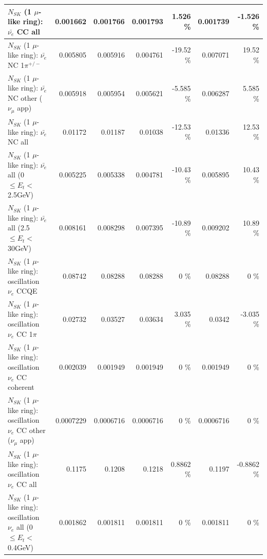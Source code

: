 \begin{table}
\begin{tabular}{| l | r | r | r  r | r  r |}
                            $N_{SK}$ (1 $\mu$-like ring): $\bar{\nu_{e}}$ CC all &        0.001662 &        0.001766 &        0.001793 &    1.526 \%  &        0.001739 &   -1.526 \%  \\ 
\hline
                     $N_{SK}$ (1 $\mu$-like ring): $\bar{\nu_e}$ NC 1$\pi^{+/-}$ &        0.005805 &        0.005916 &        0.004761 &   -19.52 \%  &        0.007071 &    19.52 \%  \\ 
            $N_{SK}$ (1 $\mu$-like ring): $\bar{\nu_e}$ NC other ($\nu_\mu$ app) &        0.005918 &        0.005954 &        0.005621 &   -5.585 \%  &        0.006287 &    5.585 \%  \\ 
                            $N_{SK}$ (1 $\mu$-like ring): $\bar{\nu_{e}}$ NC all &         0.01172 &         0.01187 &         0.01038 &   -12.53 \%  &         0.01336 &    12.53 \%  \\ 
\hline
     $N_{SK}$ (1 $\mu$-like ring): $\bar{\nu_{e}}$ all (0 $\leq E_{t} <$ 2.5GeV) &        0.005225 &        0.005338 &        0.004781 &   -10.43 \%  &        0.005895 &    10.43 \%  \\ 
    $N_{SK}$ (1 $\mu$-like ring): $\bar{\nu_{e}}$ all (2.5 $\leq E_{t} <$ 30GeV) &        0.008161 &        0.008298 &        0.007395 &   -10.89 \%  &        0.009202 &    10.89 \%  \\ 
\hline
\hline
\hline
                          $N_{SK}$ (1 $\mu$-like ring): oscillation $\nu_e$ CCQE &         0.08742 &         0.08288 &         0.08288 &        0 \%  &         0.08288 &        0 \%  \\ 
                     $N_{SK}$ (1 $\mu$-like ring): oscillation $\nu_e$ CC 1$\pi$ &         0.02732 &         0.03527 &         0.03634 &    3.035 \%  &          0.0342 &   -3.035 \%  \\ 
                   $N_{SK}$ (1 $\mu$-like ring): oscillation $\nu_e$ CC coherent &        0.002039 &        0.001949 &        0.001949 &        0 \%  &        0.001949 &        0 \%  \\ 
      $N_{SK}$ (1 $\mu$-like ring): oscillation $\nu_e$ CC other ($\nu_\mu$ app) &       0.0007229 &       0.0006716 &       0.0006716 &        0 \%  &       0.0006716 &        0 \%  \\ 
                       $N_{SK}$ (1 $\mu$-like ring): oscillation $\nu_e$  CC all &          0.1175 &          0.1208 &          0.1218 &   0.8862 \%  &          0.1197 &  -0.8862 \%  \\ 
\hline
$N_{SK}$ (1 $\mu$-like ring): oscillation $\nu_{e}$ all (0 $\leq E_{t} <$ 0.4GeV) &        0.001862 &        0.001811 &        0.001811 &        0 \%  &        0.001811 &        0 \%  \\ 

\end{tabular}
\end{table}
